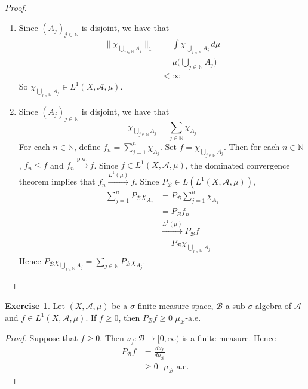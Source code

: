 \documentclass[12pt]{amsart}
\theoremstyle{definition}
\newtheorem{ex}[definition]{Exercise}
\newcommand{\sig}{\sigma}
\newcommand{\N}{\mathbb{N}}
\newcommand{\MA}{\mathcal{A}}
\newcommand{\MB}{\mathcal{B}}
\newcommand{\dmu}{\, d \mu}
\newcommand{\convt}[1]{\xrightarrow{\text{#1}}}
\newcommand{\conv}[1]{\xrightarrow{#1}}
\begin{document}
	\begin{proof}\
		\begin{enumerate}
			\item Since $(A_j)_{j \in \N}$ is disjoint, we have that 
			\begin{align*}
				\|\chi_{\bigcup\limits_{j \in \N} A_j}\|_1 
				& = \int \chi_{\bigcup\limits_{j \in \N} A_j} \dmu \\
				& = \mu\bigg(\bigcup\limits_{j \in \N} A_j \bigg) \\
				& < \infty
			\end{align*}
			So $\chi_{\bigcup\limits_{j \in \N} A_j} \in L^1(X, \MA, \mu)$.
			\item Since  $(A_j)_{j \in \N}$ is disjoint, we have that 
			$$\chi_{\bigcup\limits_{j \in \N} A_j} = \sum\limits_{j \in \N} \chi_{A_j}$$
			For each $n \in \N$, define $f_n = \sum\limits_{j = 1}^n \chi_{A_j}$. Set $f = \chi_{\bigcup\limits_{j \in \N} A_j}$. Then for each $n \in \N$, $f_n \leq f$ and $f_n \convt{p.w.} f$. Since $f \in L^1(X, \MA, \mu)$, the dominated convergence theorem implies that $f_n \conv{L^1(\mu)} f$. Since $P_{\MB} \in L(L^1(X, \MA, \mu))$, 
			\begin{align*}
				\sum_{j=1}^n P_{\MB} \chi_{A_j}
				& = P_{\MB} \sum_{j=1}^n \chi_{A_j} \\
				& = P_{B}f_n \\
				& \conv{L^1(\mu)} P_{\MB}f \\
				& = P_{\MB} \chi_{\bigcup\limits_{j \in \N} A_j} 
			\end{align*}  
			Hence  $P_{\MB} \chi_{\bigcup\limits_{j \in \N} A_j} = \sum\limits_{j \in \N} P_{\MB}\chi_{A_j}$.
		\end{enumerate}
	\end{proof}

	\begin{ex}
		Let $(X, \MA, \mu)$ be a $\sig$-finite measure space, $\MB$ a sub $\sig$-algebra of $\MA$ and $f \in L^1(X, \MA, \mu)$. If $f \geq 0$, then $P_{\MB}f \geq 0$ $\mu_{\MB}$-a.e.
	\end{ex}

	\begin{proof}
		Suppose that $f \geq 0$. Then $\nu_f: \MB \rightarrow [0, \infty)$ is a finite measure. Hence 
		\begin{align*}
			P_{\MB}f 
			& = \frac{d \nu_f}{d \mu_{\MB}} \\
			& \geq 0 \text{ $\mu_{\MB}$-a.e.}
		\end{align*}
	\end{proof}
\end{document}
